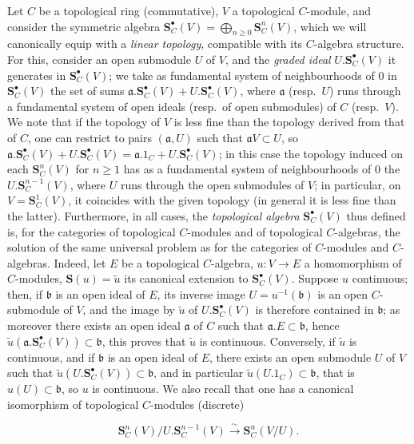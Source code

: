 \begin{env}[19.5.1]
\label{0.19.5.1}
Let $C$ be a topological ring (commutative), $V$ a topological $C$-module, and consider the symmetric algebra $\mathbf{S}_C^\bullet(V)=\bigoplus_{n\geq 0}\mathbf{S}_C^n(V)$, which we will canonically equip with a \emph{linear topology}, compatible with its $C$-algebra structure.
For this, consider an open submodule $U$ of $V$, and the \emph{graded ideal} $U.\mathbf{S}_C^\bullet(V)$ it generates in $\mathbf{S}_C^\bullet(V)$;
we take as fundamental system of neighbourhoods of $0$ in $\mathbf{S}_C^\bullet(V)$ the set of sums $\mathfrak{a}.\mathbf{S}_C^\bullet(V)+U.\mathbf{S}_C^\bullet(V)$, where $\mathfrak{a}$ (resp.\ $U$) runs through a fundamental system of open ideals (resp.\ of open submodules) of $C$ (resp.\ $V$).
We note that if the topology of $V$ is less fine than the topology derived from that of $C$, one can restrict to pairs $(\mathfrak{a},U)$ such that $\mathfrak{a}V\subset U$, so $\mathfrak{a}.\mathbf{S}_C^\bullet(V)+U.\mathbf S_C^\bullet(V)=\mathfrak{a}.1_C+U.\mathbf{S}_C^\bullet(V)$;
in this case the topology induced on each $\mathbf{S}_C^n(V)$ for $n\geq 1$ has as a fundamental system of neighbourhoods of $0$ the $U.\mathbf{S}_C^{n-1}(V)$, where $U$ runs through the open submodules of $V$;
in particular, on $V=\mathbf{S}_C^1(V)$, it coincides with the given topology (in general it is less fine than the latter).
Furthermore, in all cases, the \emph{topological algebra} $\mathbf{S}_C^\bullet(V)$ thus defined is, for the categories of topological $C$-modules and of topological $C$-algebras, the solution of the same universal problem as for the categories of $C$-modules and $C$-algebras.
Indeed, let $E$ be a topological $C$-algebra, $u:V\to E$ a homomorphism of $C$-modules, $\mathbf{S}(u)=\widetilde{u}$ its canonical extension to $\mathbf{S}_C^\bullet(V)$.
Suppose $u$ continuous; then, if $\mathfrak{b}$ is an open ideal of $E$, its inverse image $U=u^{-1}(\mathfrak{b})$ is an open $C$-submodule of $V$, and the image by $\widetilde{u}$ of $U.\mathbf{S}_C^\bullet(V)$ is therefore contained in $\mathfrak{b}$;
as moreover there exists an open ideal $\mathfrak{a}$ of $C$ such that $\mathfrak{a}.E\subset\mathfrak{b}$, hence $\widetilde{u}(\mathfrak{a}.\mathbf{S}_C^\bullet(V))\subset\mathfrak{b}$, this proves that $\widetilde{u}$ is continuous.
Conversely, if $\widetilde{u}$ is continuous, and if $\mathfrak{b}$ is an open ideal of $E$, there exists an open submodule $U$ of $V$ such that $\widetilde{u}(U.\mathbf{S}_C^\bullet(V))\subset\mathfrak{b}$, and in particular $\widetilde{u}(U.1_C)\subset\mathfrak{b}$, that is $u(U)\subset\mathfrak{b}$, so $u$ is continuous.
We also recall that one has a canonical isomorphism of topological $C$-modules (discrete)

\[
\mathbf{S}_C^n(V)/U.\mathbf{S}_C^{n-1}(V) \xrightarrow{\sim} \mathbf{S}_C^n(V/U). \tag{19.5.1.1}
\]

\end{env}

